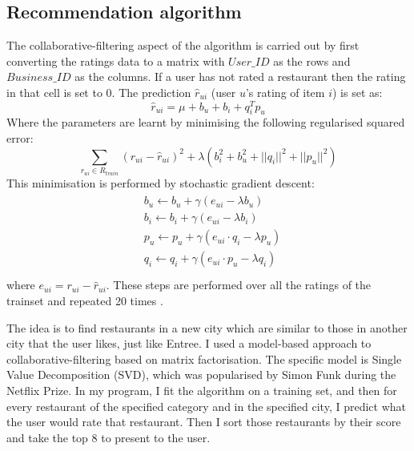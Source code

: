 \documentclass[conference]{IEEEtran}
\begin{document}
\subsection{Recommendation algorithm}
The collaborative-filtering aspect of the algorithm is carried out by first converting the ratings data to a 
matrix with $User\_ID$ as the rows and $Business\_ID$ as the columns. 
If a user has not rated a restaurant then the rating in that cell is set to 0. 
The prediction $\widehat{r}_{ui}$ (user $u$'s rating of item $i$) is set as:
\begin{equation}
    \widehat{r}_{ui} = \mu + b_u + b_i + q_i^Tp_u
\end{equation}
Where the parameters are learnt by minimising the following regularised squared error: 
\begin{equation}
    \sum_{r_{ui}\in{R_{train}}} (r_{ui} - \widehat{r}_{ui})^2 + \lambda(b_i^2 + b_u^2 + ||q_i||^2 + ||p_u||^2)
\end{equation}
This minimisation is performed by stochastic gradient descent:
\begin{align}
    \begin{split}
    & b_u \gets b_u + \gamma(e_{ui} - \lambda b_u) \\
    & b_i \gets b_i + \gamma(e_{ui} - \lambda b_i) \\ 
    & p_u \gets p_u + \gamma(e_{ui} \cdot q_i - \lambda p_u) \\ 
    & q_i \gets q_i + \gamma(e_{ui} \cdot p_u - \lambda q_i) \\
    \end{split}
\end{align}
where $e_{ui} = r_{ui} - \widehat{r}_{ui}$. 
These steps are performed over all the ratings of the trainset and repeated 20 times \cite{SVD}. 

The idea is to find restaurants in a new city which are similar to those in another city that the user likes, just like Entree. 
I used a model-based approach to collaborative-filtering based on matrix factorisation. 
The specific model is Single Value Decomposition (SVD), which was popularised by Simon Funk during the Netflix Prize. 
In my program, I fit the algorithm on a training set, and then for every restaurant of the specified category 
and in the specified city, I predict what the user would rate that restaurant. 
Then I sort those restaurants by their score and take the top 8 to present to the user. 
\end{document}
